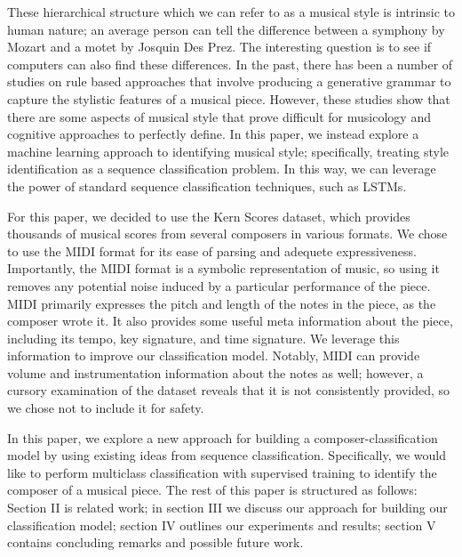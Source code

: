 \documentclass[11pt,a4paper]{article}
\begin{document}
These hierarchical structure which we can refer to as a musical style is intrinsic to human nature; an average person can tell the difference between a symphony by Mozart and a motet by Josquin Des Prez. The interesting question is to see if computers can also find these differences. In the past, there has been a number of studies on rule based approaches that involve producing a generative grammar to capture the stylistic features of a musical piece. However, these studies show that there are some aspects of musical style that prove difficult for musicology and cognitive approaches to perfectly define. In this paper, we instead explore a machine learning approach to identifying musical style; specifically, treating style identification as a sequence classification problem. In this way, we can leverage the power of standard sequence classification techniques, such as LSTMs.

For this paper, we decided to use the Kern Scores dataset, which provides thousands of musical scores from several composers in various formats. We chose to use the MIDI format for its ease of parsing and adequete expressiveness. Importantly, the MIDI format is a symbolic representation of music, so using it removes any potential noise induced by a particular performance of the piece. MIDI primarily expresses the pitch and length of the notes in the piece, as the composer wrote it. It also provides some useful meta information about the piece, including its tempo, key signature, and time signature. We leverage this information to improve our classification model. Notably, MIDI can provide volume and instrumentation information about the notes as well; however, a cursory examination of the dataset reveals that it is not consistently provided, so we chose not to include it for safety.

In this paper, we explore a new approach for building a composer-classification model by using existing ideas from sequence classification. Specifically, we would like to perform multiclass classification with supervised training to identify the composer of a musical piece. The rest of this paper is structured as follows: Section II is related work; in section III we discuss our approach for building our classification model; section IV outlines our experiments and results; section V contains concluding remarks and possible future work.
\end{document}
